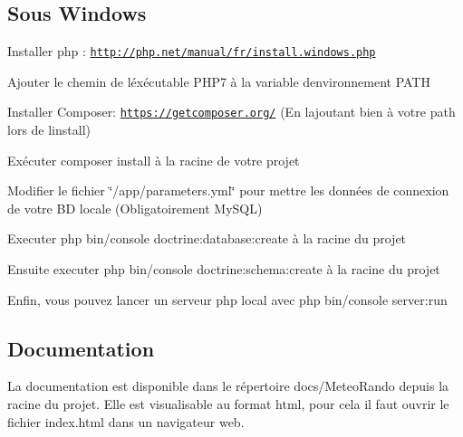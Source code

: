 

\subsection*{Sous Windows \label{_msdos}%
}


\begin{DoxyItemize}
\item Installer php \+: {\ttfamily \href{http://php.net/manual/fr/install.windows.php}{\tt http\+://php.\+net/manual/fr/install.\+windows.\+php}}
\item Ajouter le chemin de l\textquotesingle{}éxécutable P\+H\+P7 à la variable d\textquotesingle{}environnement P\+A\+TH
\item Installer Composer\+: \href{https://getcomposer.org/}{\tt https\+://getcomposer.\+org/} (En l\textquotesingle{}ajoutant bien à votre path lors de l\textquotesingle{}install)
\item Exécuter {\ttfamily composer install} à la racine de votre projet
\item Modifier le fichier \char`\"{}/app/parameters.\+yml\char`\"{} pour mettre les données de connexion de votre BD locale (Obligatoirement My\+S\+QL)
\item Executer {\ttfamily php bin/console doctrine\+:database\+:create} à la racine du projet
\item Ensuite executer {\ttfamily php bin/console doctrine\+:schema\+:create} à la racine du projet
\item Enfin, vous pouvez lancer un serveur php local avec {\ttfamily php bin/console server\+:run}
\end{DoxyItemize}

\subsection*{Documentation \label{_doc}%
}

La documentation est disponible dans le répertoire {\ttfamily docs/\+Meteo\+Rando} depuis la racine du projet. Elle est visualisable au format html, pour cela il faut ouvrir le fichier {\ttfamily index.\+html} dans un navigateur web. 